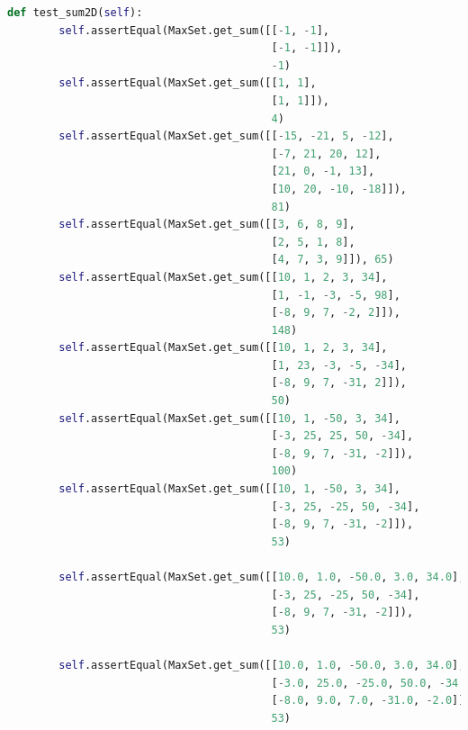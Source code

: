 \documentclass{article}
\begin{document}
\begin{lstlisting}[language = python]
    def test_sum2D(self):
        self.assertEqual(MaxSet.get_sum([[-1, -1],
                                         [-1, -1]]), 
                                         -1)
        self.assertEqual(MaxSet.get_sum([[1, 1],
                                         [1, 1]]), 
                                         4)
        self.assertEqual(MaxSet.get_sum([[-15, -21, 5, -12],
                                         [-7, 21, 20, 12],
                                         [21, 0, -1, 13],
                                         [10, 20, -10, -18]]), 
                                         81)
        self.assertEqual(MaxSet.get_sum([[3, 6, 8, 9],
                                         [2, 5, 1, 8],
                                         [4, 7, 3, 9]]), 65)
        self.assertEqual(MaxSet.get_sum([[10, 1, 2, 3, 34],
                                         [1, -1, -3, -5, 98],
                                         [-8, 9, 7, -2, 2]]), 
                                         148)
        self.assertEqual(MaxSet.get_sum([[10, 1, 2, 3, 34],
                                         [1, 23, -3, -5, -34],
                                         [-8, 9, 7, -31, 2]]), 
                                         50)
        self.assertEqual(MaxSet.get_sum([[10, 1, -50, 3, 34],
                                         [-3, 25, 25, 50, -34],
                                         [-8, 9, 7, -31, -2]]), 
                                         100)
        self.assertEqual(MaxSet.get_sum([[10, 1, -50, 3, 34],
                                         [-3, 25, -25, 50, -34],
                                         [-8, 9, 7, -31, -2]]), 
                                         53)

        self.assertEqual(MaxSet.get_sum([[10.0, 1.0, -50.0, 3.0, 34.0],
                                         [-3, 25, -25, 50, -34],
                                         [-8, 9, 7, -31, -2]]), 
                                         53)

        self.assertEqual(MaxSet.get_sum([[10.0, 1.0, -50.0, 3.0, 34.0],
                                         [-3.0, 25.0, -25.0, 50.0, -34.0],
                                         [-8.0, 9.0, 7.0, -31.0, -2.0]]), 
                                         53)
\end{lstlisting}
\end{document}
